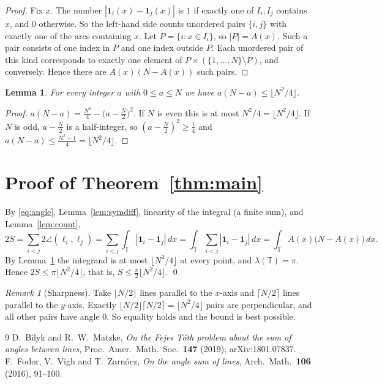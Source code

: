 \documentclass[11pt]{article}
\newtheorem{lemma}[theorem]{Lemma}
\theoremstyle{definition}
\theoremstyle{remark}
\newtheorem{remark}[theorem]{Remark}
\theoremstyle{definition}
\newcommand{\T}{\mathbb{T}}
\begin{document}
\begin{proof}
Fix $x$. The number $|\mathbf 1_i(x)-\mathbf 1_j(x)|$ is $1$ if exactly one of $I_i,I_j$ contains
$x$, and $0$ otherwise. So the left-hand side counts unordered pairs $\{i,j\}$ with exactly one
of the arcs containing $x$. Let $P=\{i : x\in I_i\}$, so $|P|=A(x)$. Such a pair consists of one
index in $P$ and one index outside $P$. Each unordered pair of this kind corresponds to exactly
one element of $P\times(\{1,\dots,N\}\setminus P)$, and conversely. Hence there are
$A(x)(N-A(x))$ such pairs.
\end{proof}

\begin{lemma}\label{lem:int}
For every integer $a$ with $0\le a\le N$ we have $a(N-a)\le\lfloor N^2/4\rfloor$.
\end{lemma}

\begin{proof}
$a(N-a)=\frac{N^2}{4}-\bigl(a-\frac N2\bigr)^2$. If $N$ is even this is at most $N^2/4=\lfloor N^2/4\rfloor$.
If $N$ is odd, $a-\frac N2$ is a half-integer, so $(a-\frac N2)^2\ge\frac14$ and
$a(N-a)\le\frac{N^2-1}{4}=\lfloor N^2/4\rfloor$.
\end{proof}

\section{Proof of Theorem~\ref{thm:main}}

By \eqref{eq:angle}, Lemma~\ref{lem:symdiff}, linearity of the integral (a finite sum), and
Lemma~\ref{lem:count},
\[
  2S=\sum_{i<j}2\angle(\ell_i,\ell_j)
    =\sum_{i<j}\int_{\T}|\mathbf 1_i-\mathbf 1_j|\,dx
    =\int_{\T}\sum_{i<j}|\mathbf 1_i-\mathbf 1_j|\,dx
    =\int_{\T}A(x)\bigl(N-A(x)\bigr)\,dx .
\]
By Lemma~\ref{lem:int} the integrand is at most $\lfloor N^2/4\rfloor$ at every point, and
$\lambda(\T)=\pi$. Hence $2S\le\pi\lfloor N^2/4\rfloor$, that is,
$S\le\frac\pi2\lfloor N^2/4\rfloor$. \qed

\begin{remark}[Sharpness]
Take $\lfloor N/2\rfloor$ lines parallel to the $x$-axis and $\lceil N/2\rceil$ lines parallel to the
$y$-axis. Exactly $\lfloor N/2\rfloor\lceil N/2\rceil=\lfloor N^2/4\rfloor$ pairs are
perpendicular, and all other pairs have angle $0$. So equality holds and the bound is best possible.
\end{remark}

\begin{thebibliography}{9}
 D.~Bilyk and R.~W.~Matzke, \emph{On the Fejes T\'oth problem about the sum of angles
  between lines}, Proc.\ Amer.\ Math.\ Soc.\ \textbf{147} (2019); arXiv:1801.07837.
 F.~Fodor, V.~V\'igh and T.~Zarn\'ocz, \emph{On the angle sum of lines}, Arch.\ Math.\
  \textbf{106} (2016), 91--100.
\end{thebibliography}
\end{document}
